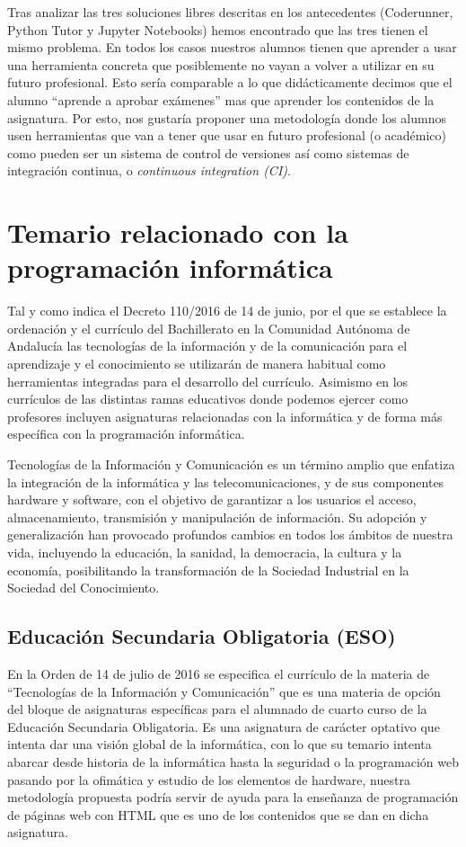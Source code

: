 Tras analizar las tres soluciones libres descritas en los antecedentes (Coderunner, Python Tutor y Jupyter Notebooks) hemos encontrado que las tres tienen el mismo problema. En todos los casos nuestros alumnos tienen que aprender a usar una herramienta concreta que posiblemente no vayan a volver a utilizar en su futuro profesional. Esto sería comparable a lo que didácticamente decimos que el alumno ``aprende a aprobar exámenes'' mas que aprender los contenidos de la asignatura. Por esto, nos gustaría proponer una metodología donde los alumnos usen herramientas que van a tener que usar en futuro profesional (o académico) como pueden ser un sistema de control de versiones así como sistemas de integración continua, o \textit{continuous integration (CI)}.

\section {Temario relacionado con la programación informática}

Tal y como indica el Decreto 110/2016  de 14 de junio, por el que se establece la ordenación y el currículo del Bachillerato en la Comunidad Autónoma de Andalucía las tecnologías de la información y de la comunicación para el aprendizaje y el conocimiento se utilizarán de manera habitual como herramientas integradas para el desarrollo del currículo. Asimismo en los currículos de las distintas ramas educativos donde podemos ejercer como profesores incluyen asignaturas relacionadas con la informática y de forma más específica con la programación informática.

\bigskip
Tecnologías de la Información y Comunicación es un término amplio que enfatiza la integración de la informática y las telecomunicaciones, y de sus componentes hardware y software, con el objetivo de garantizar a
los usuarios el acceso, almacenamiento, transmisión y manipulación de información. Su adopción y generalización han provocado profundos cambios en todos los ámbitos de nuestra vida, incluyendo la educación, la sanidad, la democracia, la cultura y la economía, posibilitando la transformación de la Sociedad Industrial en la Sociedad del Conocimiento.

\subsection {Educación Secundaria Obligatoria (ESO)}

En la Orden de 14 de julio de 2016 se especifica el currículo de la materia de ``Tecnologías de la Información y Comunicación'' que es una materia de opción del bloque de asignaturas específicas para el alumnado de cuarto curso de la Educación Secundaria Obligatoria. Es una asignatura de carácter optativo que intenta dar una visión global de la informática, con lo que su temario intenta abarcar desde historia de la informática hasta la seguridad o la programación web pasando por la ofimática y estudio de los elementos de hardware, nuestra metodología propuesta podría servir de ayuda para la enseñanza de programación de páginas web con HTML que es uno de los contenidos que se dan en dicha asignatura.

